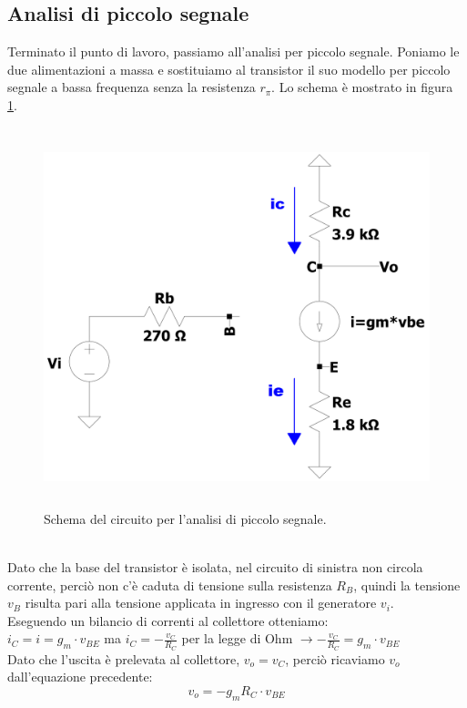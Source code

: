 \documentclass{report}
\begin{document}
\subsection{Analisi di piccolo segnale} \label{CEv3_pscap}
Terminato il punto di lavoro, passiamo all'analisi per piccolo segnale. Poniamo le due alimentazioni a massa e sostituiamo al transistor il suo modello per piccolo segnale a bassa frequenza senza la resistenza $r_\pi$. Lo schema è mostrato in figura \ref{figura:CEv2_ps}.
\begin{figure}[h]
\centering
\includegraphics[height=11cm]{immagini/CEv2_ps}
\caption{Schema del circuito per l'analisi di piccolo segnale.}
\label{figura:CEv2_ps}
\end{figure}
\\Dato che la base del transistor è isolata, nel circuito di sinistra non circola corrente, perciò non c'è caduta di tensione sulla resistenza $R_B$, quindi la tensione $v_B$ risulta pari alla tensione applicata in ingresso con il generatore $v_i$.
\\Eseguendo un bilancio di correnti al collettore otteniamo:
\\[2pt]\indent$i_C=i=g_m\cdot v_{BE}$ \indent ma $\displaystyle{i_C=-\frac{v_C}{R_C}}$ per la legge di Ohm $\displaystyle{\rightarrow -\frac{v_C}{R_C}=g_m\cdot v_{BE}}$
\\[2pt]Dato che l'uscita è prelevata al collettore, $v_o=v_C$, perciò ricaviamo $v_o$ dall'equazione precedente:
\begin{equation}
v_o=-g_m R_C\cdot v_{BE}
\label{f1}
\end{equation}
\end{document}

